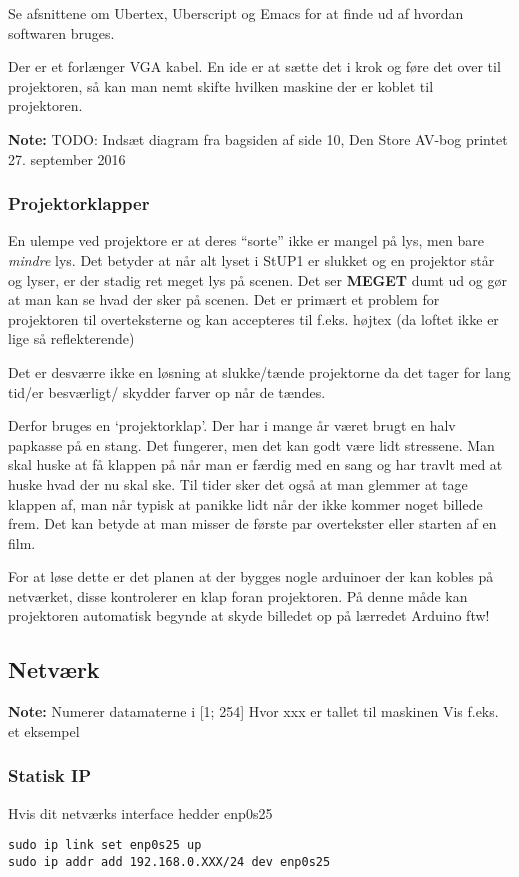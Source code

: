 \documentclass[10pt,a4paper,danish]{article}
\let\oldmarginnote\marginnote
\renewcommand{\marginnote}[1]{\oldmarginnote{\raggedright{}\footnotesize #1}}
\newcommand{\note}[1]{\begin{mdframed}[style=note]\textbf{Note:}
    #1\end{mdframed}}
\begin{document}
Se afsnittene om Ubertex, Uberscript og Emacs for at finde ud af hvordan
softwaren bruges.

Der er et forlænger VGA kabel.
En ide er at sætte det i krok og føre det over til projektoren, så kan man nemt
skifte hvilken maskine der er koblet til projektoren.
\note{TODO: Indsæt diagram fra bagsiden af side 10, Den Store AV-bog printet 27.
  september 2016}

\subsubsection{Projektorklapper}
En ulempe ved projektore er at deres ``sorte'' ikke er mangel på lys, men bare
\textit{mindre} lys. Det betyder at når alt lyset i StUP1 er slukket og en
projektor står og lyser, er der stadig ret meget lys på scenen. Det ser
\textbf{MEGET} dumt ud og gør at man kan se hvad der sker på scenen.
Det er primært et problem for projektoren til overteksterne og kan accepteres
til f.eks. højtex (da loftet ikke er lige så reflekterende)

Det er desværre ikke en løsning at slukke/tænde projektorne da det tager for lang
tid/er besværligt/ skydder farver op når de tændes.

Derfor bruges en `projektorklap'. Der har i mange år været brugt en halv
papkasse på en stang. Det fungerer, men det kan godt være lidt stressene. Man
skal huske at få klappen på når man er færdig med en sang og har travlt med at
huske hvad der nu skal ske. Til tider sker det også at man glemmer at tage klappen
af, man når typisk at panikke lidt når der ikke kommer noget billede frem. Det
kan betyde at man misser de første par overtekster eller starten af en film.


For at løse dette er det planen at der bygges nogle arduinoer der kan kobles på netværket, disse
kontrolerer en klap foran projektoren. På denne måde kan projektoren automatisk
begynde at skyde billedet op på lærredet
Arduino ftw!

\subsection{Netværk}
\note{Numerer datamaterne i [1; 254] Hvor xxx er tallet til maskinen
  Vis f.eks. et eksempel}
\subsubsection{Statisk IP}
\marginnote{\note{How to know?}}
Hvis dit netværks interface hedder enp0s25
\begin{verbatim}
sudo ip link set enp0s25 up
sudo ip addr add 192.168.0.XXX/24 dev enp0s25
\end{verbatim}
\end{document}
